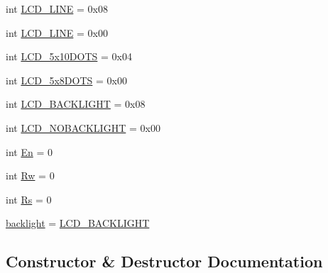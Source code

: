 \begin{DoxyCompactItemize}
\item 
int \hyperlink{classdriver_1_1LCD__DRIVER_1_1LCD_adff821ac4bc8133e94dbc30a4a8cea3e}{L\+C\+D\+\_\+L\+I\+N\+E} = 0x08
\item 
int \hyperlink{classdriver_1_1LCD__DRIVER_1_1LCD_a7a6ac4fbef8a8b85dca204ea6f68563b}{L\+C\+D\+\_\+L\+I\+N\+E} = 0x00
\item 
int \hyperlink{classdriver_1_1LCD__DRIVER_1_1LCD_abb958d3d77183e9d79dec256939bf6ce}{L\+C\+D\+\_\+5x10\+D\+O\+T\+S} = 0x04
\item 
int \hyperlink{classdriver_1_1LCD__DRIVER_1_1LCD_a5ec59491f9f0ffcff843f4d942fe9b73}{L\+C\+D\+\_\+5x8\+D\+O\+T\+S} = 0x00
\item 
int \hyperlink{classdriver_1_1LCD__DRIVER_1_1LCD_ab561475ec42356be07b859bccc49e441}{L\+C\+D\+\_\+\+B\+A\+C\+K\+L\+I\+G\+H\+T} = 0x08
\item 
int \hyperlink{classdriver_1_1LCD__DRIVER_1_1LCD_a177f789e02e3cc5beb8c962b6f413101}{L\+C\+D\+\_\+\+N\+O\+B\+A\+C\+K\+L\+I\+G\+H\+T} = 0x00
\item 
int \hyperlink{classdriver_1_1LCD__DRIVER_1_1LCD_a4ac70789c28a90ac717c080eb0ad44c5}{En} = 0
\item 
int \hyperlink{classdriver_1_1LCD__DRIVER_1_1LCD_aa414dbce7b4b58751c5c08c8cf5bb406}{Rw} = 0
\item 
int \hyperlink{classdriver_1_1LCD__DRIVER_1_1LCD_a35d42fe004231a154653b30da370cbdc}{Rs} = 0
\item 
\hyperlink{classdriver_1_1LCD__DRIVER_1_1LCD_a15ab6095283680557c894c117a6b4fff}{backlight} = \hyperlink{classdriver_1_1LCD__DRIVER_1_1LCD_ab561475ec42356be07b859bccc49e441}{L\+C\+D\+\_\+\+B\+A\+C\+K\+L\+I\+G\+H\+T}
\end{DoxyCompactItemize}


\subsection{Constructor \& Destructor Documentation}
\hypertarget{classdriver_1_1LCD__DRIVER_1_1LCD_a20225b4d0a79ea608ab2788528735b17}{}
